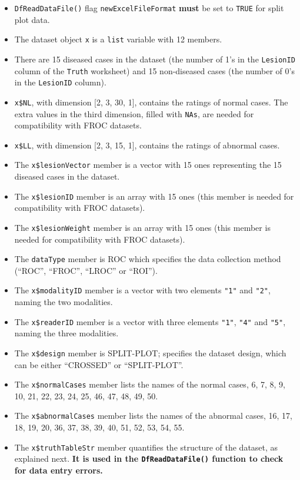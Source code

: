 \documentclass[]{book}
\providecommand{\tightlist}{%
  \setlength{\itemsep}{0pt}\setlength{\parskip}{0pt}}
\begin{document}
\begin{itemize}
\tightlist
\item
  \texttt{DfReadDataFile()} flag \texttt{newExcelFileFormat} \textbf{must} be set to \texttt{TRUE} for split plot data.
\item
  The dataset object \texttt{x} is a \texttt{list} variable with 12 members.
\item
  There are 15 diseased cases in the dataset (the number of 1's in the \texttt{LesionID} column of the \texttt{Truth} worksheet) and 15 non-diseased cases (the number of 0's in the \texttt{LesionID} column).
\item
  \texttt{x\$NL}, with dimension {[}2, 3, 30, 1{]}, contains the ratings of normal cases. The extra values in the third dimension, filled with \texttt{NAs}, are needed for compatibility with FROC datasets.
\item
  \texttt{x\$LL}, with dimension {[}2, 3, 15, 1{]}, contains the ratings of abnormal cases.
\item
  The \texttt{x\$lesionVector} member is a vector with 15 ones representing the 15 diseased cases in the dataset.
\item
  The \texttt{x\$lesionID} member is an array with 15 ones (this member is needed for compatibility with FROC datasets).
\item
  The \texttt{x\$lesionWeight} member is an array with 15 ones (this member is needed for compatibility with FROC datasets).
\item
  The \texttt{dataType} member is ROC which specifies the data collection method (``ROC'', ``FROC'', ``LROC'' or ``ROI'').
\item
  The \texttt{x\$modalityID} member is a vector with two elements \texttt{"1"} and \texttt{"2"}, naming the two modalities.
\item
  The \texttt{x\$readerID} member is a vector with three elements \texttt{"1"}, \texttt{"4"} and \texttt{"5"}, naming the three modalities.
\item
  The \texttt{x\$design} member is SPLIT-PLOT; specifies the dataset design, which can be either ``CROSSED'' or ``SPLIT-PLOT''.
\item
  The \texttt{x\$normalCases} member lists the names of the normal cases, 6, 7, 8, 9, 10, 21, 22, 23, 24, 25, 46, 47, 48, 49, 50.
\item
  The \texttt{x\$abnormalCases} member lists the names of the abnormal cases, 16, 17, 18, 19, 20, 36, 37, 38, 39, 40, 51, 52, 53, 54, 55.
\item
  The \texttt{x\$truthTableStr} member quantifies the structure of the dataset, as explained next. \textbf{It is used in the \texttt{DfReadDataFile()} function to check for data entry errors.}
\end{itemize}
\end{document}
